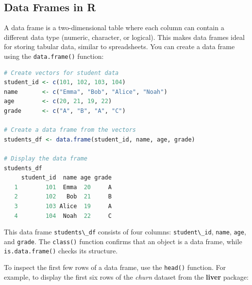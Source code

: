 \documentclass[
]{book}
\newcommand{\passthrough}[1]{#1}
\theoremstyle{definition}
\theoremstyle{definition}
\theoremstyle{definition}
\theoremstyle{definition}
\theoremstyle{remark}
\begin{document}
\subsection*{Data Frames in R}\label{data-frames-in-r}

A data frame is a two-dimensional table where each column can contain a different data type (numeric, character, or logical). This makes data frames ideal for storing tabular data, similar to spreadsheets. You can create a data frame using the \passthrough{\lstinline!data.frame()!} function:

\begin{lstlisting}[language=R]
# Create vectors for student data
student_id <- c(101, 102, 103, 104)
name       <- c("Emma", "Bob", "Alice", "Noah")
age        <- c(20, 21, 19, 22)
grade      <- c("A", "B", "A", "C")

# Create a data frame from the vectors
students_df <- data.frame(student_id, name, age, grade)

# Display the data frame
students_df
     student_id  name age grade
   1        101  Emma  20     A
   2        102   Bob  21     B
   3        103 Alice  19     A
   4        104  Noah  22     C
\end{lstlisting}

This data frame \passthrough{\lstinline!students\_df!} consists of four columns: \passthrough{\lstinline!student\_id!}, \passthrough{\lstinline!name!}, \passthrough{\lstinline!age!}, and \passthrough{\lstinline!grade!}. The \passthrough{\lstinline!class()!} function confirms that an object is a data frame, while \passthrough{\lstinline!is.data.frame()!} checks its structure.

To inspect the first few rows of a data frame, use the \passthrough{\lstinline!head()!} function. For example, to display the first six rows of the \emph{churn} dataset from the \textbf{liver} package:
\end{document}
